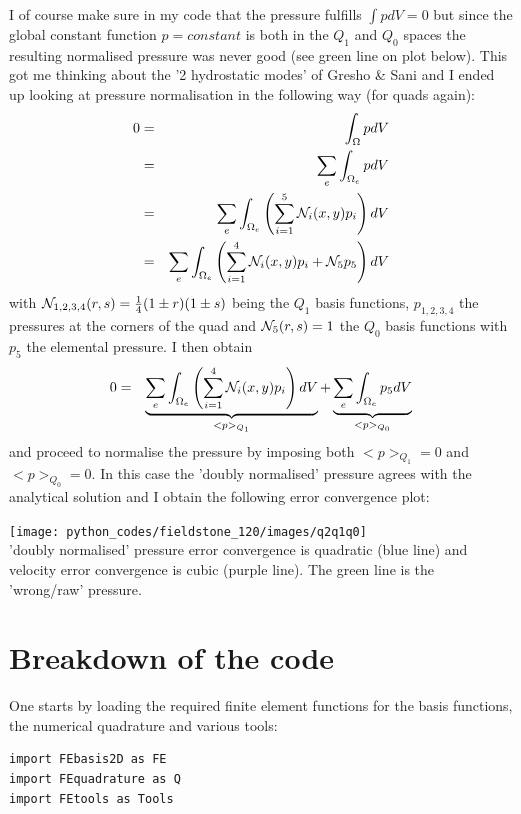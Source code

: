 I of course make sure in my code that the pressure fulfills $\int p dV=0$ but since 
the global constant function $p=constant$ is both in the $Q_1$ and $Q_0$ spaces the 
resulting normalised pressure was never good (see green line on plot below). 
This got me thinking about the '2 hydrostatic modes' of Gresho \& Sani and
I ended up looking at pressure normalisation in the following way (for quads again):
\begin{eqnarray}
0 
&=& \int_\Omega p dV \nonumber\\
&=& \sum_e \int_{\Omega_e} p dV \nonumber\\
&=& \sum_e \int_{\Omega_e} \left( \sum_{i=1}^5 {\mathcal{N}}_i(x,y) p_i \right) dV \nonumber\\
&=& \sum_e \int_{\Omega_e} \left( \sum_{i=1}^4 {\mathcal{N}}_i(x,y) p_i + {\mathcal{N}}_5 p_5 \right) dV
\end{eqnarray}
with ${\mathcal{N}}_{1,2,3,4}(r,s)=\frac14(1\pm r)(1\pm s)$ being
the $Q_1$ basis functions, $p_{1,2,3,4}$ the pressures at the corners
of the quad and ${\mathcal{N}}_5(r,s)=1$ the $Q_0$ basis functions with $p_5$ the elemental pressure.
I then obtain 
\begin{eqnarray}
0 
&=& \underbrace{\sum_e \int_{\Omega_e} \left( \sum_{i=1}^4 {\mathcal{N}}_i(x,y) p_i \right) dV}_{<p>_{Q_1}}
+ \underbrace{\sum_e \int_{\Omega_e} p_5  dV}_{<p>_{Q_0}}
\end{eqnarray}
and proceed to normalise the pressure by imposing both $<p>_{Q_1}=0$ and $<p>_{Q_0}=0$.
In this case the 'doubly normalised' pressure agrees with the analytical solution 
and I obtain the following error convergence plot:

\begin{center}
\texttt{[image: python\_codes/fieldstone\_120/images/q2q1q0]}\\
{\captionfont 'doubly normalised' pressure error convergence is quadratic (blue line) and 
velocity error convergence is cubic (purple line). The green line is the 'wrong/raw' pressure. }
\end{center}




\newpage
\section*{Breakdown of the code}

One starts by loading the required finite element functions 
for the basis functions, the numerical quadrature and various tools:
\begin{lstlisting}
import FEbasis2D as FE
import FEquadrature as Q
import FEtools as Tools 
\end{lstlisting}

